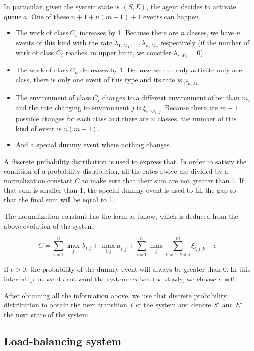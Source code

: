 \documentclass[
  a4paper, xcolor = usenames,dvipsnames]{article}
\providecommand{\tightlist}{%
  \setlength{\itemsep}{0pt}\setlength{\parskip}{0pt}}
\begin{document}
In particular, given the system state is \((S, E)\), the agent decides to activate queue \(a\). One of these \(n + 1 + n(m - 1) + 1\) events can happen.

\begin{itemize}
\tightlist
\item
  The work of class \(C_{i}\) increases by 1. Because there are \(n\) classes, we have \(n\) events of this kind with the rate \(\lambda_{1, M_{1}}, \dots, \lambda_{n, M_{n}}\) respectively (if the number of work of class \(C_{i}\) reaches an upper limit, we consider \(\lambda_{i, M_{i}} = 0\)).
\item
  The work of class \(C_{a}\) decreases by 1. Because we can only activate only one class, there is only one event of this type and its rate is \(\mu_{a, M_{a}}\).
\item
  The environment of class \(C_{i}\) changes to a different environment other than \(m_{i}\) and the rate changing to environment \(j\) is \(\xi_{i, M_{i}, j}\). Because there are \(m - 1\) possible changes for each class and there are \(n\) classes, the number of this kind of event is \(n(m - 1)\).
\item
  And a special dummy event where nothing changes.
\end{itemize}

A discrete probability distribution is used to express that. In order to satisfy the condition of a probability distribution, all the rates above are divided by a normalization constant \(C\) to make sure that their sum are not greater than 1. If that sum is smaller than 1, the special dummy event is used to fill the gap so that the final sum will be equal to 1.

The normalization constant has the form as follow, which is deduced from the above evolution of the system.

\[
C = \sum_{i = 1}^{n} \max_{j} \lambda_{i, j} + \max_{i, j} \mu_{i, j} + \sum_{i = 1}^{n} \max_{j} \sum_{k = 1, k \neq j}^{m} \xi_{i, j, k} + \epsilon
\]

If \(\epsilon > 0\), the probability of the dummy event will always be greater than 0. In this internship, as we do not want the system evolves too slowly, we choose \(\epsilon \coloneq 0\).

After obtaining all the information above, we use that discrete probability distribution to obtain the next transition \(T\) of the system and denote \(S'\) and \(E'\) the next state of the system.

\hypertarget{load-balancing-system}{%
\subsection{Load-balancing system}\label{load-balancing-system}}
\end{document}
